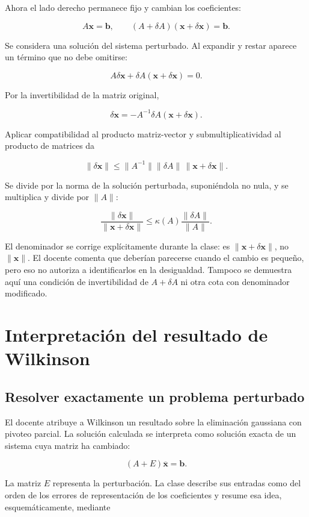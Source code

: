 \documentclass[12pt,a4paper]{article}
\begin{document}
Ahora el lado derecho permanece fijo y cambian los coeficientes:

\[
A\mathbf x=\mathbf b,\qquad
(A+\delta A)(\mathbf x+\delta\mathbf x)=\mathbf b.
\]

Se considera una solución del sistema perturbado. Al expandir y restar aparece un término que no debe omitirse:

\[
A\delta\mathbf x+\delta A(\mathbf x+\delta\mathbf x)=0.
\]

Por la invertibilidad de la matriz original,

\[
\delta\mathbf x=-A^{-1}\delta A(\mathbf x+\delta\mathbf x).
\]

Aplicar compatibilidad al producto matriz-vector y submultiplicatividad al producto de matrices da

\[
\|\delta\mathbf x\|\le\|A^{-1}\|\|\delta A\|\,
\|\mathbf x+\delta\mathbf x\|.
\]

Se divide por la norma de la solución perturbada, suponiéndola no nula, y se multiplica y divide por $\|A\|$:

\[
\boxed{\frac{\|\delta\mathbf x\|}{\|\mathbf x+\delta\mathbf x\|}
\le\kappa(A)\frac{\|\delta A\|}{\|A\|}}.
\]

El denominador se corrige explícitamente durante la clase: es $\|\mathbf x+\delta\mathbf x\|$, no $\|\mathbf x\|$. El docente comenta que deberían parecerse cuando el cambio es pequeño, pero eso no autoriza a identificarlos en la desigualdad. Tampoco se demuestra aquí una condición de invertibilidad de $A+\delta A$ ni otra cota con denominador modificado.

\section{Interpretación del resultado de Wilkinson}

\subsection{Resolver exactamente un problema perturbado}

El docente atribuye a Wilkinson un resultado sobre la eliminación gaussiana con pivoteo parcial. La solución calculada se interpreta como solución exacta de un sistema cuya matriz ha cambiado:

\[
\boxed{(A+E)\overline{\mathbf x}=\mathbf b}.
\]

La matriz $E$ representa la perturbación. La clase describe sus entradas como del orden de los errores de representación de los coeficientes y resume esa idea, esquemáticamente, mediante
\end{document}
